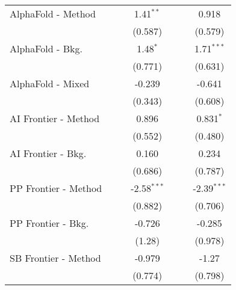\begin{tabular}{lcccccc}
   AlphaFold - Method           &                &               & 1.41$^{**}$   &                &               & 0.918\\   
                                &                &               & (0.587)       &                &               & (0.579)\\   
   AlphaFold - Bkg.             &                &               & 1.48$^{*}$    &                &               & 1.71$^{***}$\\   
                                &                &               & (0.771)       &                &               & (0.631)\\   
   AlphaFold - Mixed            &                &               & -0.239        &                &               & -0.641\\   
                                &                &               & (0.343)       &                &               & (0.608)\\   
   AI Frontier - Method         &                &               & 0.896         &                &               & 0.831$^{*}$\\   
                                &                &               & (0.552)       &                &               & (0.480)\\   
   AI Frontier - Bkg.           &                &               & 0.160         &                &               & 0.234\\   
                                &                &               & (0.686)       &                &               & (0.787)\\   
   PP Frontier - Method         &                &               & -2.58$^{***}$ &                &               & -2.39$^{***}$\\   
                                &                &               & (0.882)       &                &               & (0.706)\\   
   PP Frontier - Bkg.           &                &               & -0.726        &                &               & -0.285\\   
                                &                &               & (1.28)        &                &               & (0.978)\\   
   SB Frontier - Method         &                &               & -0.979        &                &               & -1.27\\   
                                &                &               & (0.774)       &                &               & (0.798)\\   

\end{tabular}
